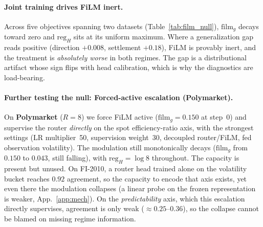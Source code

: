 \documentclass{article}
\begin{document}
\paragraph{Joint training drives FiLM inert.}
Across five objectives spanning two datasets (Table~\ref{tab:film_null}), $\mathrm{film}_g$ decays toward zero and $\mathrm{reg}_H$ sits at its
uniform maximum. Where a generalization gap reads
positive (direction $+0.008$, settlement $+0.18$), FiLM is provably inert, and the
treatment is \emph{absolutely worse} in both regimes. The gap is a distributional
artifact whose sign flips with head calibration, which is why the diagnostics are
load-bearing.

\paragraph{Further testing the null: Forced-active escalation (Polymarket).}
On
\textbf{Polymarket} ($R{=}8$) we force FiLM active ($\mathrm{film}_g=0.150$ at
step~0) and supervise the router
\emph{directly} on the spot efficiency-ratio axis, with the strongest settings (LR
multiplier~50, supervision weight~30, decoupled router/FiLM, fed observation
volatility). The modulation still monotonically decays ($\mathrm{film}_g$ from
$0.150$ to $0.043$, still falling), with $\mathrm{reg}_H=\log 8$ throughout. The
capacity is present but unused. On FI-2010, a router head trained alone on the
volatility bucket reaches $0.92$ agreement, so the capacity to encode that
axis exists, yet even there the modulation collapses (a linear probe on the frozen
representation is weaker, App.~\ref{app:mech}). On the \emph{predictability} axis,
which this escalation directly supervises, agreement is only weak
($\approx0.25$--$0.36$), so the collapse cannot be blamed on missing regime
information.
\end{document}
